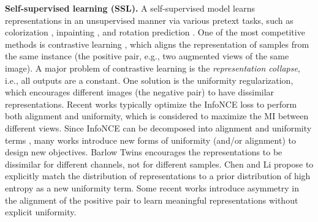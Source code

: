 \documentclass[runningheads]{llncs}
\begin{document}
\noindent\textbf{Self-supervised learning (SSL).} A self-supervised model learns representations in an unsupervised manner via various pretext tasks, such as colorization \cite{zhang2016colorful,larsson2016learning}, inpainting \cite{pathak2016context}, and rotation prediction \cite{gidaris2018unsupervised}. 
One of the most competitive methods is contrastive learning \cite{hadsell2006dimensionality,oord2018representation,hjelm2018learning,tian2019contrastive,chen2020a,he2020momentum}, which aligns the representation of samples from the same instance (the positive pair, e.g., two augmented views of the same image).
A major problem of contrastive learning is the \textit{representation collapse}, i.e., all outputs are a constant.
One solution is the uniformity regularization, which encourages different images (the negative pair) to have dissimilar representations.
Recent works \cite{chen2020a,he2020momentum} typically optimize the InfoNCE loss \cite{oord2018representation,gutmann2010noise} to perform both alignment and uniformity, which is considered to maximize the MI between different views.
Since InfoNCE can be decomposed into alignment and uniformity terms \cite{chen2020intriguing,wang2020understanding}, many works introduce new forms of uniformity (and/or alignment) to design new objectives. 
Barlow Twins \cite{zbontar2021barlow} encourages the representations to be dissimilar for different channels, not for different samples. 
Chen and Li \cite{chen2020intriguing} propose to explicitly match the distribution of representations to a prior distribution of high entropy as a new uniformity term. 
Some recent works \cite{chen2020exploring,tian2021understanding,grill2020bootstrap} introduce asymmetry in the alignment of the positive pair to learn meaningful representations without explicit uniformity.
\end{document}
